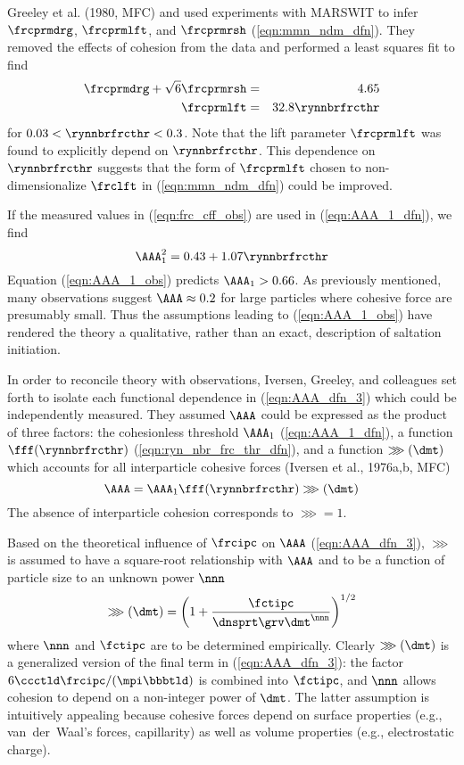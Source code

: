 \documentclass[12pt,twoside]{book}
\begin{document}
Greeley et al. (1980, MFC) and \cite{IvW82} used experiments with
MARSWIT to infer $\frcprmdrg$, $\frcprmlft$, and $\frcprmrsh$ 
(\ref{eqn:mmn_ndm_dfn}). 
They removed the effects of cohesion from the data and performed a
least squares fit to find
\begin{eqnarray}
\label{eqn:frc_cff_obs}
\frcprmdrg + \sqrt{6} \frcprmrsh & = & 4.65 \nonumber \\
\frcprmlft & = & 32.8 \rynnbrfrcthr
\end{eqnarray}
for $0.03 < \rynnbrfrcthr < 0.3$.
Note that the lift parameter $\frcprmlft$ was found to explicitly
depend on $\rynnbrfrcthr$. 
This dependence on $\rynnbrfrcthr$ suggests that the form of 
$\frcprmlft$ chosen to non-dimensionalize $\frclft$ in
(\ref{eqn:mmn_ndm_dfn}) could be improved.

If the measured values in (\ref{eqn:frc_cff_obs}) are used in 
(\ref{eqn:AAA_1_dfn}), we find 
\begin{equation}
\AAA_{1}^{2} = 0.43 + 1.07 \rynnbrfrcthr
\label{eqn:AAA_1_obs}
\end{equation}
Equation (\ref{eqn:AAA_1_obs}) predicts $\AAA_{1} > 0.66$.
As previously mentioned, many observations suggest $\AAA \approx 0.2$ 
for large particles \cite[e.g.,][p. 88]{Bag41} where cohesive force
are presumably small.   
Thus the assumptions leading to (\ref{eqn:AAA_1_obs}) have rendered
the theory a qualitative, rather than an exact, description of
saltation initiation. 

In order to reconcile theory with observations, Iversen, Greeley, and 
colleagues set forth to isolate each functional dependence in
(\ref{eqn:AAA_dfn_3}) which could be independently measured.
They assumed $\AAA$ could be expressed as the product of three factors:
the cohesionless threshold $\AAA_{1}$ (\ref{eqn:AAA_1_dfn}), 
a function $\fff(\rynnbrfrcthr)$ (\ref{eqn:ryn_nbr_frc_thr_dfn}), 
and a function $\ggg(\dmt)$ which accounts for all interparticle
cohesive forces (Iversen et al., 1976a,b, MFC) 
\begin{equation}
\AAA = \AAA_{1} \fff(\rynnbrfrcthr) \ggg(\dmt) 
\label{eqn:AAA_dfn_4}
\end{equation}
The absence of interparticle cohesion corresponds to $\ggg = 1$.

Based on the theoretical influence of $\frcipc$ on $\AAA$
(\ref{eqn:AAA_dfn_3}), $\ggg$ is assumed to have a square-root
relationship with $\AAA$ and to be a function of particle size to an
unknown power $\nnn$   
\begin{equation}
\ggg(\dmt) = \left( 1 + \frac{\fctipc}{\dnsprt \grv \dmt^{\nnn}} \right)^{1/2}
\label{eqn:ggg_dfn}
\end{equation}
where $\nnn$ and $\fctipc$ are to be determined empirically.
Clearly $\ggg(\dmt)$ is a generalized version of the final term in 
(\ref{eqn:AAA_dfn_3}):
the factor $6 \ccctld \frcipc / (\mpi \bbbtld)$ is combined into
$\fctipc$, and $\nnn$ allows cohesion to depend on a non-integer power
of $\dmt$.
The latter assumption is intuitively appealing because cohesive forces
depend on surface properties (e.g., van~der~Waal's forces,
capillarity) as well as volume properties (e.g., electrostatic
charge). 
\end{document}
